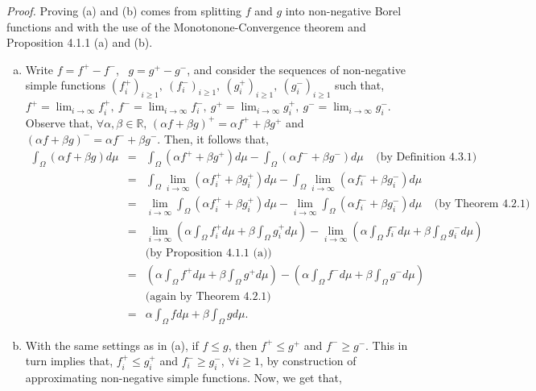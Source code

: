 \documentclass{article}
\begin{document}
\textit{Proof.} Proving (a) and (b) comes from splitting $f$ and $g$ into non-negative Borel functions and with the use of the Monotonone-Convergence theorem and Proposition 4.1.1 (a) and (b).
\begin{enumerate}[(a)]
	\item Write $f = f^+ - f^-$, \ $g = g^+ - g^-$, and consider the sequences of non-negative simple functions $(f_i^+)_{i\geq1}, \ (f_i^-)_{i\geq1}, \ (g_i^+)_{i\geq1}, \ (g_i^-)_{i\geq1}$ such that, $f^+ = \lim_{i\to\infty}f_i^+, \ f^- = \lim_{i\to\infty}f_i^-, \ g^+ = \lim_{i\to\infty}g_i^+, \ g^- = \lim_{i\to\infty}g_i^-$. Observe that, $\forall \alpha, \beta \in \mathbb{R}$, $(\alpha f + \beta g)^+ = \alpha f^+ + \beta g^+$ and $(\alpha f + \beta g)^- = \alpha f^- + \beta g^-$. Then, it follows that,
	\begin{eqnarray}
	\nonumber
	\int_\Omega (\alpha f + \beta g) d\mu &=& \int_\Omega (\alpha f^+ + \beta g^+)d\mu - \int_\Omega (\alpha f^- + \beta g^-)d\mu \ \ \ \ \ \text{(by Definition 4.3.1)}\\
	\nonumber
	&=& \int_\Omega \lim_{i\to\infty}(\alpha f_i^+ + \beta g_i^+)d\mu - \int_\Omega \lim_{i\to\infty} (\alpha f_i^- + \beta g_i^-)d\mu\\
	\nonumber
	&=& \lim_{i\to\infty}\int_\Omega (\alpha f_i^+ + \beta g_i^+)d\mu - \lim_{i\to\infty}\int_\Omega (\alpha f_i^- + \beta g_i^-)d\mu \ \ \ \ \ \text{(by Theorem 4.2.1)}\\
	\nonumber
	&=& \lim_{i\to\infty}\left(\alpha\int_\Omega f_i^+ d\mu + \beta\int_\Omega g_i^+ d\mu\right) - \lim_{i\to\infty}\left(\alpha\int_\Omega f_i^- d\mu + \beta\int_\Omega g_i^- d\mu\right) \\
	\nonumber
	&{}& \text{(by Proposition 4.1.1 (a))}\\
	\nonumber
	&=& \left(\alpha\int_\Omega f^+ d\mu + \beta\int_\Omega g^+ d\mu\right) - \left(\alpha\int_\Omega f^- d\mu + \beta\int_\Omega g^- d\mu\right) \\
	\nonumber
	&{}& \text{(again by Theorem 4.2.1)}\\
	\nonumber
	&=& \alpha\int_\Omega f d\mu + \beta\int_\Omega g d\mu.
	\end{eqnarray}
	\item With the same settings as in (a), if $f \leq g$, then $f^+ \leq g^+$ and $f^- \geq g^-$. This in turn implies that, $f_i^+ \leq g_i^+$ and $f_i^- \geq g_i^-$, $\forall i \geq 1$, by construction of approximating non-negative simple functions. Now, we get that,
	\begin{eqnarray}
	\nonumber

\end{eqnarray}
\end{enumerate}
\end{document}
